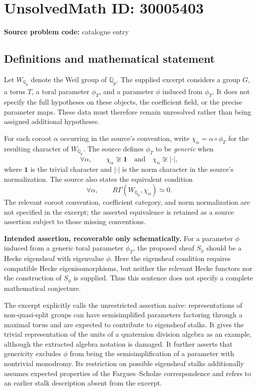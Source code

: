 \documentclass[11pt]{article}
\newcommand{\Q}{\mathbb{Q}}
\begin{document}
\section*{UnsolvedMath ID: 30005403}
\textbf{Source problem code:} catalogue entry
\subsection{Definitions and mathematical statement}
Let \(W_{\Q_p}\) denote the Weil group of \(\Q_p\). The supplied excerpt considers a group \(G\), a torus \(T\), a toral parameter \(\phi_T\), and a parameter \(\phi\) induced from \(\phi_T\). It does not specify the full hypotheses on these objects, the coefficient field, or the precise parameter maps. These data must therefore remain unresolved rather than being assigned additional hypotheses.

For each coroot \(\alpha\) occurring in the source's convention, write \(\chi_\alpha=\alpha\circ\phi_T\) for the resulting character of \(W_{\Q_p}\). The source defines \(\phi_T\) to be \emph{generic} when
\[
\forall\alpha,\qquad \chi_\alpha\not\cong\mathbf{1}\quad\text{and}\quad\chi_\alpha\not\cong|\cdot|,
\]
where \(\mathbf{1}\) is the trivial character and \(|\cdot|\) is the norm character in the source's normalization. The source also states the equivalent condition
\[
\forall\alpha,\qquad R\Gamma(W_{\Q_p},\chi_\alpha)\simeq 0.
\]
The relevant coroot convention, coefficient category, and norm normalization are not specified in the excerpt; the asserted equivalence is retained as a source assertion subject to those missing conventions.

\textbf{Intended assertion, recoverable only schematically.} For a parameter \(\phi\) induced from a generic toral parameter \(\phi_T\), the proposed sheaf \(S_\phi\) should be a Hecke eigensheaf with eigenvalue \(\phi\). Here the eigensheaf condition requires compatible Hecke eigenisomorphisms, but neither the relevant Hecke functors nor the construction of \(S_\phi\) is supplied. Thus this sentence does not specify a complete mathematical conjecture.

The excerpt explicitly calls the unrestricted assertion naive: representations of non-quasi-split groups can have semisimplified parameters factoring through a maximal torus and are expected to contribute to eigensheaf stalks. It gives the trivial representation of the units of a quaternion division algebra as an example, although the extracted algebra notation is damaged. It further asserts that genericity excludes \(\phi\) from being the semisimplification of a parameter with nontrivial monodromy. Its restriction on possible eigensheaf stalks additionally assumes expected properties of the Fargues--Scholze correspondence and refers to an earlier stalk description absent from the excerpt.
\end{document}
